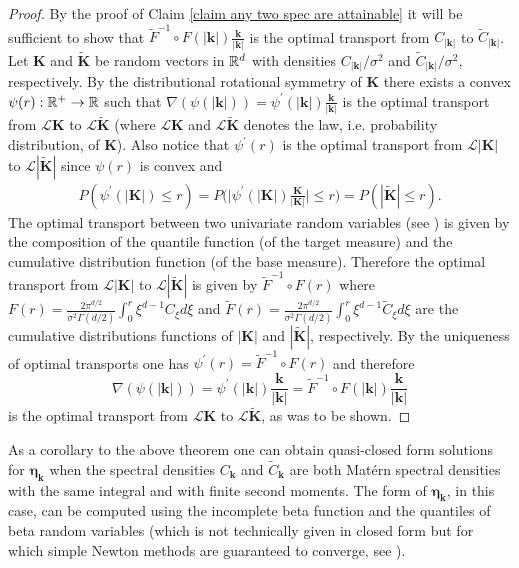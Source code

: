 \documentclass[10pt,noinfoline]{imsart}
\newcommand{\bs}{\boldsymbol}
\begin{document}
\begin{proof}
By the proof of Claim \ref{claim any two spec are attainable} it will be sufficient to show that $\tilde F^{-1}\circ F(|\bs k|)\frac{\bs k}{|\bs k|}$ is the optimal transport from $C_{|\bs k|}$ to $\tilde C_{|\bs k|}$.
Let $\bs K$ and $\tilde {\bs K}$ be random vectors in $\Bbb R^d$ with densities $C_{|\bs k|}/\sigma^2$ and $\tilde C_{|\bs k|}/\sigma^2$, respectively. By the distributional rotational symmetry of $\bs K$ there exists a convex $\psi(r):\Bbb R^+ \rightarrow \Bbb R$ such that $\nabla (\psi(|\bs k|))=\psi^\prime(|\bs k|)\frac{\bs k}{|\bs k|}$ is the optimal transport from $\mathscr L\bs K$ to $\mathscr L\tilde{\bs K}$ (where $\mathscr L\bs K$ and $\mathscr L\tilde{\bs K}$ denotes the law, i.e. probability distribution, of $\bs K$). Also notice that $\psi^\prime(r)$ is the optimal transport from $\mathscr L |\bs K|$ to  $\mathscr L|\tilde{\bs K}|$ since $\psi(r)$ is convex and
\begin{align*}
P(\psi^\prime(|\bs K|)\leq r) = P\big(\big|\psi^\prime(|\bs K|)\textstyle\frac{\bs K}{|\bs K|}\big|\leq r\big) = P(|\tilde{\bs K}|\leq r).
\end{align*}
The optimal transport between two univariate random variables (see \cite{villani2003topics}) is given by the composition of the quantile function (of the target measure) and the cumulative distribution function (of the base measure). Therefore the optimal transport from $\mathscr L|\bs K|$ to $\mathscr L|\tilde{\bs K}|$ is given by $\tilde F^{-1}\circ F(r)$ where $F(r)=\frac{2\pi^{d/2}}{\sigma^2\Gamma(d/2)}\int_0^r \xi^{d-1}C_\xi d\xi$ and $\tilde F(r)=\frac{2\pi^{d/2}}{\sigma^2\Gamma(d/2)}\int_0^r \xi^{d-1}\tilde C_\xi d\xi$ are the cumulative distributions functions of $|\bs K|$ and $|\tilde{\bs K}|$, respectively. By the uniqueness of optimal transports one has $\psi^\prime(r)=\tilde F^{-1}\circ F(r)$ and therefore 
\[
\nabla (\psi(|\bs k|))=\psi^\prime(|\bs k|)\frac{\bs k}{|\bs k|} = \tilde F^{-1}\circ F(|\bs k|)\frac{\bs k}{|\bs k|}
\]
is the optimal transport from $\mathcal L\bs K$ to $\mathcal L\tilde{\bs K}$,
as was to be shown.
\end{proof}

As a corollary to the above theorem one can obtain quasi-closed form solutions for $\bs \eta_{\bs k}$ when the spectral densities $C_{\bs k}$ and $\tilde C_{\bs k}$ are both Mat\'ern spectral densities with the same integral and with finite second moments. The form of $\bs \eta_{\bs k}$, in this case, can be computed using the incomplete beta function and the quantiles of beta random variables (which is not technically given in closed form but for which simple Newton methods are guaranteed to converge, see \cite{giner2014monotonically}).
\end{document}
